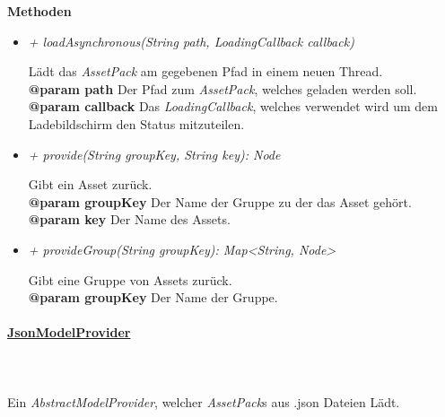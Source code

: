         \textbf{Methoden}
        \begin{itemize}
            \item \textit{+ loadAsynchronous(String path, LoadingCallback callback)}
                \begin{leftbar}[0.9\linewidth]
                    Lädt das \textit{AssetPack} am gegebenen Pfad in einem neuen Thread.\\
                    \textbf{@param path} Der Pfad zum \textit{AssetPack}, welches geladen werden soll.\\
                    \textbf{@param callback} Das \textit{LoadingCallback}, welches verwendet wird um dem Ladebildschirm den Status mitzuteilen.
                \end{leftbar}
            \item \textit{+ provide(String groupKey, String key): Node}
                \begin{leftbar}[0.9\linewidth]
                    Gibt ein Asset zurück.\\
                    \textbf{@param groupKey} Der Name der Gruppe zu der das Asset gehört.\\
                    \textbf{@param key} Der Name des Assets.
                \end{leftbar}
            \item \textit{+ provideGroup(String groupKey): Map<String, Node>}
                \begin{leftbar}[0.9\linewidth]
                    Gibt eine Gruppe von Assets zurück.\\
                    \textbf{@param groupKey} Der Name der Gruppe.
                \end{leftbar}
        \end{itemize}

    \paragraph{\underline{JsonModelProvider}} \mbox{}\\
    \\
        Ein \textit{AbstractModelProvider}, welcher \textit{AssetPack}s aus .json Dateien Lädt.\par

